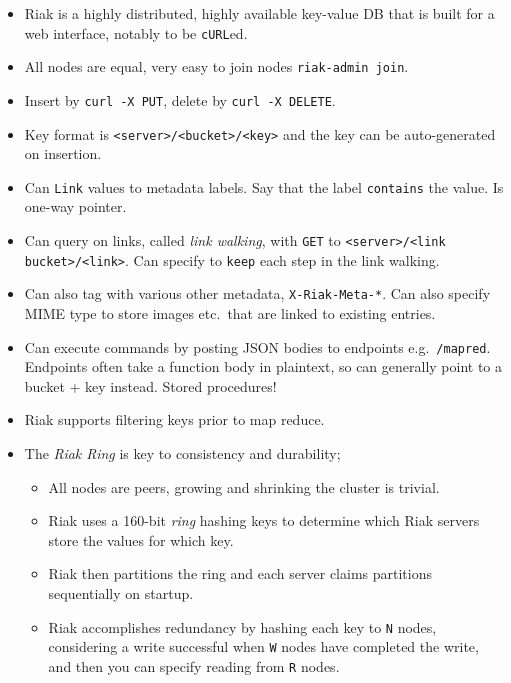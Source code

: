 \documentclass[10pt]{article}
\begin{document}
\begin{itemize}
    \item Riak is a highly distributed, highly available key-value DB that is
        built for a web interface, notably to be \lstinline{cURL}ed.
    \item All nodes are equal, very easy to join nodes
        \lstinline{riak-admin join}.
    \item Insert by \lstinline{curl -X PUT}, delete by
        \lstinline{curl -X DELETE}.
    \item Key format is \lstinline{<server>/<bucket>/<key>} and the key can be
        auto-generated on insertion.
    \item Can \lstinline{Link} values to metadata labels. Say that the label
        \lstinline{contains} the value. Is one-way pointer.
    \item Can query on links, called \emph{link walking}, with \lstinline{GET}
        to \lstinline{<server>/<link bucket>/<link>}. Can specify to
        \lstinline{keep} each step in the link walking.
    \item Can also tag with various other metadata, \lstinline{X-Riak-Meta-*}.
        Can also specify MIME type to store images etc.\ that are linked to
        existing entries.
    \item Can execute commands by posting JSON bodies to endpoints e.g.\
        \lstinline{/mapred}. Endpoints often take a function body in plaintext,
        so can generally point to a bucket + key instead. Stored procedures!
    \item Riak supports filtering keys prior to map reduce.
    \item The \emph{Riak Ring} is key to consistency and durability;
        \begin{itemize}
            \item All nodes are peers, growing and shrinking the cluster is
                trivial.
            \item Riak uses a 160-bit \emph{ring} hashing keys to determine
                which Riak servers store the values for which key.
            \item Riak then partitions the ring and each server claims
                partitions sequentially on startup.
            \item Riak accomplishes redundancy by hashing each key to
                \lstinline{N} nodes, considering a write successful when
                \lstinline{W} nodes have completed the write, and then you can
                specify reading from \lstinline{R} nodes.

\end{itemize}
\end{itemize}
\end{document}
